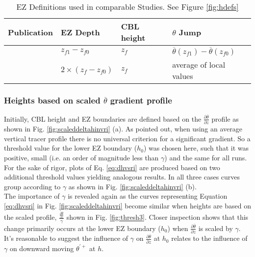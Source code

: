   
\begin{table}[htbp]
\label{table:elandri}
\caption[EZ Definitions used in comparable Studies]{EZ Definitions used in comparable Studies.  See Figure \ref{fig:hdefs}}

\begin{tabular}{ p{3.9cm} p{} p{} p{3cm}}

Publication & EZ Depth & CBL height & $\theta$ Jump\\ \hline
\cite{FedConzMir04} & $z_{f1} - z_{f0}$ & $z_{f}$ &  $\overline{\theta}(z_{f1})-\overline{\theta}(z_{f0})$\\ %
\cite{BrooksFowler2} & $2 \times (z_{f} - z_{f0})$ & $z_{f}$ & average of local values\\ \hline

\end{tabular}
\end{table}


\subsubsection{Heights based on scaled $\overline{\theta}$ gradient profile}

Initially, CBL height and EZ boundaries are defined based on the $\frac{\partial \overline{\theta}}{\partial z}$ profile as shown in Fig. \ref{fig:scaleddeltahinvri} (a).  As \cite{BrooksFowler2} pointed out, when using an average vertical tracer profile there is no universal criterion for a significant gradient.  So a threshold value for the lower EZ boundary ($h_{0}$) was chosen here, such that it was positive, small (i.e. an order of magnitude less than $\gamma$) and the same for all runs.  For the sake of rigor, plots of Eq. \ref{eq:dhvsri}
are produced based on two additional threshold values yielding analogous results.  In all three cases curves group according to $\gamma$ as shown in Fig. \ref{fig:scaleddeltahinvri} (b).\\

The importance of $\gamma$ is revealed again as the curves representing Equation \ref{eq:dhvsri} in Fig. \ref{fig:scaleddeltahinvri} become similar when heights are based on the scaled profile, $\frac{\frac{\partial \overline{\theta}}{\partial z}}{\gamma}$ shown in Fig. \ref{fig:thresh3}. Closer inspection shows that this change primarily occurs at the lower EZ boundary ($h_{0}$) when $\frac{\partial \overline{\theta}}{\partial z}$ is scaled by $\gamma$. It's reasonable to suggest the influence of $\gamma$ on $\frac{\partial \overline{\theta}}{\partial z}$ at $h_{0}$ relates to the influence of $\gamma$ on downward moving $\theta^{'+}$ at $h$.\\

